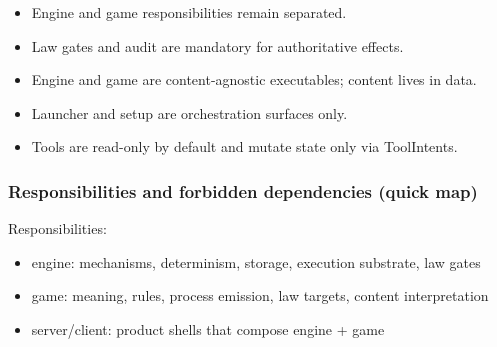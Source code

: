 \documentclass[9pt,a4paper,openany]{book}
\begin{document}
\begin{itemize}
\item Engine and game responsibilities remain separated.\allowbreak{}
\end{itemize}


\begin{itemize}
\item Law gates and audit are mandatory for authoritative effects.\allowbreak{}
\end{itemize}


\begin{itemize}
\item Engine and game are content-\allowbreak{}agnostic executables; content lives in data.\allowbreak{}
\end{itemize}


\begin{itemize}
\item Launcher and setup are orchestration surfaces only.\allowbreak{}
\end{itemize}


\begin{itemize}
\item Tools are read-\allowbreak{}only by default and mutate state only via ToolIntents.\allowbreak{}
\end{itemize}





\subsubsection{Responsibilities and forbidden dependencies (quick map)}


Responsibilities:



\begin{itemize}
\item engine: mechanisms, determinism, storage, execution substrate, law gates
\end{itemize}


\begin{itemize}
\item game: meaning, rules, process emission, law targets, content interpretation
\end{itemize}


\begin{itemize}
\item server/\allowbreak{}client: product shells that compose engine + game
\end{itemize}
\end{document}
